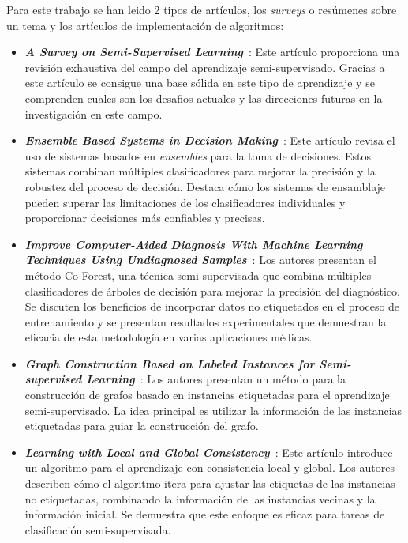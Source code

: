 Para este trabajo se han leido 2 tipos de artículos, los \textit{surveys} o resúmenes sobre un tema y los artículos de implementación de algoritmos:
\begin{itemize}
	\item \textbf{\textit{A Survey on Semi-Supervised Learning}}~\cite{Engelen:semi-supervised}: Este artículo proporciona una revisión exhaustiva del campo del aprendizaje semi-supervisado. Gracias a este artículo se consigue una base sólida en este tipo de aprendizaje y se comprenden cuales son los desafios actuales y las direcciones futuras en la investigación en este campo.
	\item \textbf{\textit{Ensemble Based Systems in Decision Making}}~\cite{ensembles}: Este artículo revisa el uso de sistemas basados en \textit{ensembles} para la toma de decisiones. Estos sistemas combinan múltiples clasificadores para mejorar la precisión y la robustez del proceso de decisión. Destaca cómo los sistemas de ensamblaje pueden superar las limitaciones de los clasificadores individuales y proporcionar decisiones más confiables y precisas.
	\item \textbf{\textit{Improve Computer-Aided Diagnosis With Machine Learning Techniques Using Undiagnosed Samples}}~\cite{IEEE:CoForest}: Los autores presentan el método Co-Forest, una técnica semi-supervisada que combina múltiples clasificadores de árboles de decisión para mejorar la precisión del diagnóstico. Se discuten los beneficios de incorporar datos no etiquetados en el proceso de entrenamiento y se presentan resultados experimentales que demuestran la eficacia de esta metodología en varias aplicaciones médicas.
	\item \textbf{\textit{Graph Construction Based on Labeled Instances for Semi-supervised Learning}}~\cite{gbili}: Los autores presentan un método para la construcción de grafos basado en instancias etiquetadas para el aprendizaje semi-supervisado. La idea principal es utilizar la información de las instancias etiquetadas para guiar la construcción del grafo.
	\item \textbf{\textit{Learning with Local and Global Consistency}}~\cite{LGC}: Este artículo introduce un algoritmo para el aprendizaje con consistencia local y global. Los autores describen cómo el algoritmo itera para ajustar las etiquetas de las instancias no etiquetadas, combinando la información de las instancias vecinas y la información inicial. Se demuestra que este enfoque es eficaz para tareas de clasificación semi-supervisada.
\end{itemize}
